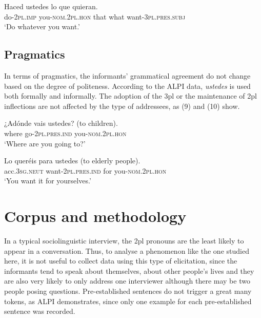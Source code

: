 \documentclass[output=paper]{LSP/langsci}
\begin{document}
\ea
\gll Haced           ustedes                  lo que      quieran.\\ 
do-\textsc{2pl.imp} you-\textsc{nom.2pl.hon} that what want-\textsc{3pl.pres.subj}\\
\glt   ‘Do whatever you want.’\\
\z

\subsection{Pragmatics}
In terms of pragmatics, the informants’ grammatical agreement do not change based on the degree of politeness. According to the ALPI data, \textit{ustedes} is used both formally and informally. The adoption of the 3pl or the maintenance of 2pl inflections are not affected by the type of addressees, as (9) and (10) show.

\ea
\gll ¿Adónde vais                      ustedes? (to children).\\
where     go-\textsc{2pl.pres.ind} you-\textsc{nom.2pl.hon}\\
\glt   ‘Where are you going to?’\\
\z

\ea
\gll Lo                     queréis                      para ustedes (to elderly people).\\
acc.\textsc{3sg.neut} want-\textsc{2pl.pres.ind} for    you-\textsc{nom.2pl.hon}\\
\glt   ‘You want it for yourselves.’\\
\z

\section{Corpus and methodology}
In a typical sociolinguistic interview, the 2pl pronouns are the least likely to appear in a conversation. Thus, to analyse a phenomenon like the one studied here, it is not useful to collect data using this type of elicitation, since the informants tend to speak about themselves, about other people’s lives and they are also very likely to only address one interviewer although there may be two people posing questions. Pre-established sentences do not trigger a great many tokens, as ALPI demonstrates, since only one example for each pre-established sentence was recorded.
\end{document}
